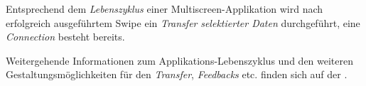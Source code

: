 {Entsprechend dem \textit{Lebenszyklus} einer Multiscreen-Applikation wird nach erfolgreich ausgeführtem Swipe ein \textit{Transfer} \textit{selektierter Daten} durchgeführt, eine \textit{Connection} besteht bereits.

Weitergehende Informationen zum Applikations-Lebenszyklus und den weiteren Gestaltungsmöglichkeiten für den \textit{Transfer}, \textit{Feedbacks} etc. finden sich auf der \developerpage.
}


\newcommand{\authors}{
Alexander Hahn, Hochschule Mannheim  \\
Valentina Burjan, Hochschule Mannheim \\
Dominick Madden, Hochschule Mannheim \\
Horst Schneider, Hochschule Mannheim}

\newcommand{\versionhistory}{12.05.2016}
\newcommand{\dateofcreation}{17.09.2015}
\newcommand{\comments}{---}
\newcommand{\questions}{---}



